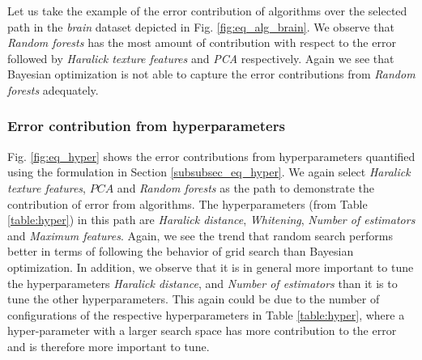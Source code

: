 Let us take the example of the error contribution of algorithms over the selected path in the \textit{brain} dataset depicted in Fig. \ref{fig:eq_alg_brain}. We observe that \textit{Random forests} has the most amount of contribution with respect to the error followed by \textit{Haralick texture features} and \textit{PCA} respectively. Again we see that Bayesian optimization is not able to capture the error contributions from \textit{Random forests} adequately.

\subsubsection{Error contribution from hyperparameters}

Fig. \ref{fig:eq_hyper} shows the error contributions from hyperparameters quantified using the formulation in Section \ref{subsubsec_eq_hyper}. We again select \textit{Haralick texture features}, $PCA$ and \textit{Random forests} as the path to demonstrate the contribution of error from algorithms. The hyperparameters (from Table \ref{table:hyper}) in this path are \textit{Haralick distance}, \textit{Whitening}, \textit{Number of estimators} and \textit{Maximum features}. Again, we see the trend that random search performs better in terms of following the behavior of grid search than Bayesian optimization. In addition, we observe that it is in general more important to tune the hyperparameters \textit{Haralick distance}, and \textit{Number of estimators} than it is to tune  the other hyperparameters. This again could be due to the number of configurations of the respective hyperparameters in Table \ref{table:hyper}, where a hyper-parameter with a larger search space has more contribution to the error and is therefore more important to tune.

